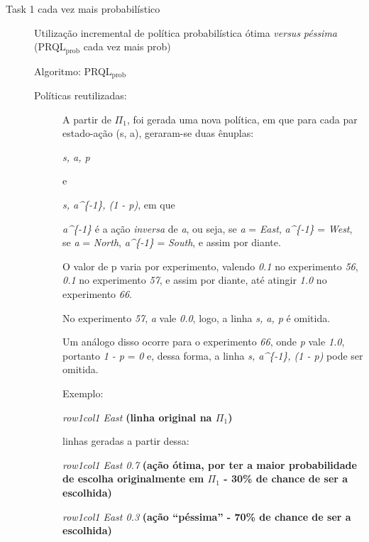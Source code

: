 \documentclass[11pt]{article}
\begin{document}
\begin{description}

\item[Task 1 cada vez mais probabilístico]\label{sec-11.1.2.1}


Utilização incremental de política probabilística ótima \emph{versus} \emph{péssima}
(PRQL$_{\mathrm{prob}}$ cada vez mais prob)

\begin{description}

\item[Algoritmo: PRQL$_{\mathrm{prob}}$]\label{sec-11.1.2.1.1}


\end{description}
\begin{description}

\item[Políticas reutilizadas:]\label{sec-11.1.2.1.2}


A partir de  $\Pi$$_1$, foi gerada uma nova política, em que para cada par estado-ação (s, a), geraram-se duas ênuplas:

\emph{s, a, p}

e

\emph{s, a^\{-1\}, (1 - p)}, em que 

\emph{a^\{-1\}} é a ação \emph{inversa} de \emph{a}, ou seja, se \emph{a} = \emph{East}, \emph{a^\{-1\}} = \emph{West}, se  \emph{a} = \emph{North}, \emph{a^\{-1\}} = \emph{South}, e assim por diante.

O valor de p varia por experimento, valendo \emph{0.1} no experimento \emph{56}, \emph{0.1} no experimento \emph{57}, e assim por diante, até atingir \emph{1.0} no experimento \emph{66}.

No experimento \emph{57}, \emph{a} vale \emph{0.0}, logo, a linha \emph{s, a, p} é omitida.

Um análogo disso ocorre para o experimento \emph{66}, onde \emph{p} vale \emph{1.0}, portanto \emph{1 - p} = \emph{0} e, dessa forma, a linha \emph{s, a^\{-1\}, (1 - p)} pode ser omitida.

Exemplo:

\emph{row1col1 East} \textbf{(linha original na $\Pi$$_1$)}

linhas geradas a partir dessa:

\emph{row1col1 East 0.7} \textbf{(ação ótima, por ter a maior probabilidade de escolha originalmente em $\Pi$$_1$ - 30\% de chance de ser a escolhida)}

\emph{row1col1 East 0.3} \textbf{(ação ``péssima'' - 70\% de chance de ser a escolhida)}


\end{description}
\end{description}
\end{document}
